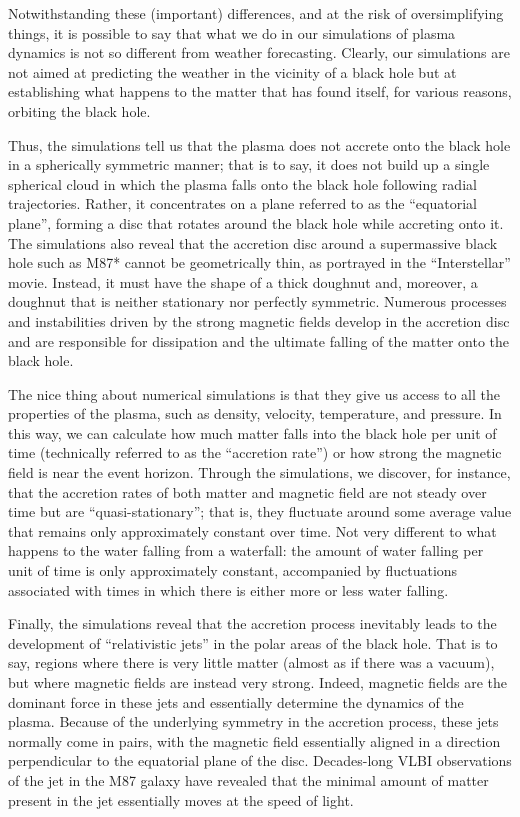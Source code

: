 Notwithstanding these (important) differences, and at the risk of oversimplifying
things, it is possible to say that what we do in our simulations of plasma dynamics is
not so different from weather forecasting. Clearly, our simulations are not aimed at
predicting the weather in the vicinity of a black hole but at establishing what happens
to the matter that has found itself, for various reasons, orbiting the black hole.

Thus, the simulations tell us that the plasma does not accrete onto the black hole in a
spherically symmetric manner; that is to say, it does not build up a single spherical
cloud in which the plasma falls onto the black hole following radial trajectories.
Rather, it concentrates on a plane referred to as the ``equatorial plane'', forming a
disc that rotates around the black hole while accreting onto it. The simulations also
reveal that the accretion disc around a supermassive black hole such as
M87* cannot be geometrically thin, as portrayed in the
``Interstellar'' movie. Instead, it must have the shape of a thick doughnut and,
moreover, a doughnut that is neither stationary nor perfectly symmetric. Numerous
processes and instabilities driven by the strong magnetic fields develop in the
accretion disc and are responsible for dissipation and the ultimate falling of the
matter onto the black hole.

The nice thing about numerical simulations is that they give us access to all the
properties of the plasma, such as density, velocity, temperature, and pressure. In this
way, we can calculate how much matter falls into the black hole per unit of time
(technically referred to as the ``accretion rate'') or how strong the magnetic field is
near the event horizon. Through the simulations, we discover, for instance, that the
accretion rates of both matter and magnetic field are not steady over time but are
``quasi-stationary''; that is, they fluctuate around some average value that remains
only approximately constant over time. Not very different to what happens to the water
falling from a waterfall: the amount of water falling per unit of time is only
approximately constant, accompanied by fluctuations associated with times in which there
is either more or less water falling.

Finally, the simulations reveal that the accretion process inevitably leads to the
development of ``relativistic jets''  in the polar areas of the black
hole. That is to say, regions where there is very little matter (almost as if there was
a vacuum), but where magnetic fields are instead very strong. Indeed,
magnetic fields are the dominant force in these jets and essentially determine the
dynamics of the plasma. Because of the underlying symmetry in the accretion process,
these jets normally come in pairs, with the magnetic field essentially aligned in a
direction perpendicular to the equatorial plane of the disc. Decades-long VLBI
observations of the jet in the M87 galaxy have revealed that the
minimal amount of matter present in the jet essentially moves at the speed of light.

